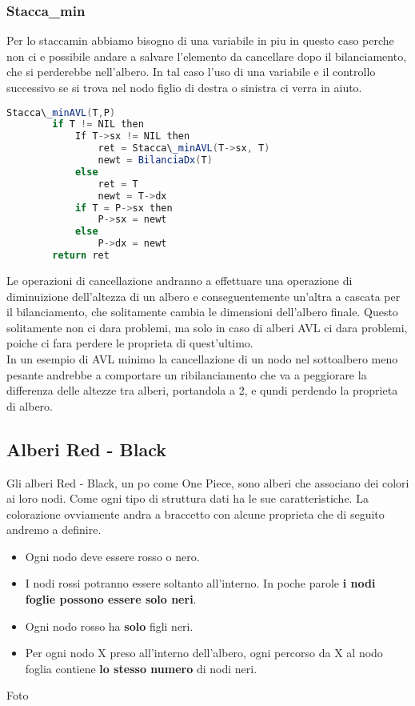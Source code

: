 \subsubsection{Stacca\_min}
Per lo staccamin abbiamo bisogno di una variabile in piu in questo caso perche non ci e possibile andare a salvare l'elemento da cancellare dopo il bilanciamento, che si perderebbe nell'albero. In tal caso l'uso di una variabile e il controllo successivo se si trova nel nodo figlio di destra o sinistra ci verra in aiuto.

\begin{lstlisting}[language=Java]
	Stacca\_minAVL(T,P)
		if T != NIL then
			If T->sx != NIL then
				ret = Stacca\_minAVL(T->sx, T)
				newt = BilanciaDx(T)
			else
				ret = T
				newt = T->dx
			if T = P->sx then
				P->sx = newt
			else
				P->dx = newt
		return ret
\end{lstlisting}

Le operazioni di cancellazione andranno a effettuare una operazione di diminuizione dell'altezza di un albero e conseguentemente un'altra a cascata per il bilanciamento, che solitamente cambia le dimensioni dell'albero finale. Questo solitamente non ci dara problemi, ma solo in caso di alberi AVL ci dara problemi, poiche ci fara perdere le proprieta di quest'ultimo. \\
In un esempio di AVL minimo la cancellazione di un nodo nel sottoalbero meno pesante andrebbe a comportare un ribilanciamento che va a peggiorare la differenza delle altezze tra alberi, portandola a 2, e qundi perdendo la proprieta di albero.

\subsection{Alberi Red - Black}
Gli alberi Red - Black, un po come One Piece, sono alberi che associano dei colori ai loro nodi. Come ogni tipo di struttura dati ha le sue caratteristiche. La colorazione ovviamente andra a braccetto con alcune proprieta che di seguito andremo a definire.

\begin{itemize}	
	\item Ogni nodo deve essere rosso o nero.
	\item I nodi rossi potranno essere soltanto all'interno. In poche parole \textbf{i nodi foglie possono essere solo neri}.
	\item Ogni nodo rosso ha \textbf{solo} figli neri.
	\item Per ogni nodo X preso all'interno dell'albero, ogni percorso da X al nodo foglia contiene \textbf{lo stesso numero} di nodi neri.
\end{itemize}

Foto

